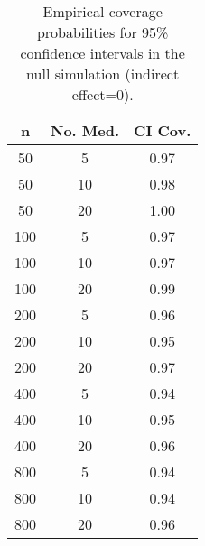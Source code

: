 \begin{table}[ht]
\centering
\begin{tabular}{c|c|c}
 n & No. Med. & CI Cov. \\ 
  \hline
50 & 5 & 0.97 \\ 
   \hline
50 & 10 & 0.98 \\ 
   \hline
50 & 20 & 1.00 \\ 
   \hline
100 & 5 & 0.97 \\ 
   \hline
100 & 10 & 0.97 \\ 
   \hline
100 & 20 & 0.99 \\ 
   \hline
200 & 5 & 0.96 \\ 
   \hline
200 & 10 & 0.95 \\ 
   \hline
200 & 20 & 0.97 \\ 
   \hline
400 & 5 & 0.94 \\ 
   \hline
400 & 10 & 0.95 \\ 
   \hline
400 & 20 & 0.96 \\ 
   \hline
800 & 5 & 0.94 \\ 
   \hline
800 & 10 & 0.94 \\ 
   \hline
800 & 20 & 0.96 \\ 
   \hline
\end{tabular}
\caption{Empirical coverage probabilities for 95\% confidence intervals in the null simulation (indirect effect=0).\label{tab:sim_null}} 
\end{table}
